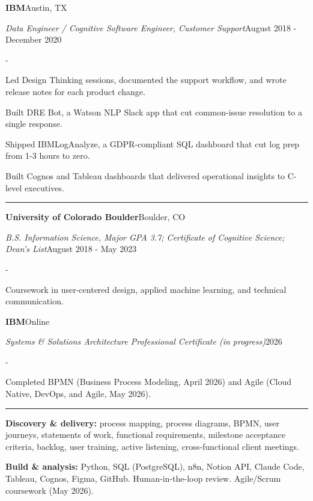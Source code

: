 \documentclass[10pt,letterpaper]{article}
\newenvironment{cvitems}{%
  \begin{list}{-}{%
    \setlength{\leftmargin}{12pt}%
    \setlength{\itemsep}{1.2pt}%
    \setlength{\parsep}{0pt}%
    \setlength{\topsep}{1.5pt}%
    \setlength{\partopsep}{0pt}%
    \setlength{\labelwidth}{6pt}%
    \setlength{\labelsep}{6pt}%
    \setlength{\itemindent}{0pt}%
  }%
}{\end{list}}
\newcommand{\cvsection}[1]{%
  \vspace{7pt}%
  \noindent{\bfseries\fontsize{11pt}{13pt}\selectfont\MakeUppercase{#1}}\par
  \vspace{1pt}%
  \noindent\rule{\textwidth}{0.4pt}\par
  \vspace{4pt}%
}
\newcommand{\cventryhead}[4]{%
  \noindent\textbf{#1}\hfill#2\par
  \vspace{0.5pt}%
  \noindent\textit{#3}\hfill#4\par
}
\newcommand{\cveduhead}[4]{%
  \noindent\textbf{#1}\hfill#2\par
  \vspace{0.5pt}%
  \noindent\textit{#3}\hfill#4\par
}
\begin{document}
\vspace{3pt}
\cventryhead{IBM}{Austin, TX}
{Data Engineer / Cognitive Software Engineer, Customer Support}{August 2018 - December 2020}
\begin{cvitems}
  \item Led Design Thinking sessions, documented the support workflow, and wrote release notes for each product change.
  \item Built DRE Bot, a Watson NLP Slack app that cut common-issue resolution to a single response.
  \item Shipped IBMLogAnalyze, a GDPR-compliant SQL dashboard that cut log prep from 1-3 hours to zero.
  \item Built Cognos and Tableau dashboards that delivered operational insights to C-level executives.
\end{cvitems}

\cvsection{Education}

\cveduhead{University of Colorado Boulder}{Boulder, CO}
{B.S. Information Science, Major GPA 3.7; Certificate of Cognitive Science; Dean's List}{August 2018 - May 2023}
\begin{cvitems}
  \item Coursework in user-centered design, applied machine learning, and technical communication.
\end{cvitems}

\vspace{3pt}
\cveduhead{IBM}{Online}
{Systems \& Solutions Architecture Professional Certificate (in progress)}{2026}
\begin{cvitems}
  \item Completed BPMN (Business Process Modeling, April 2026) and Agile (Cloud Native, DevOps, and Agile, May 2026).
\end{cvitems}

\cvsection{Skills}

{\raggedright
\noindent\textbf{Discovery \& delivery:} process mapping, process diagrams, BPMN, user journeys, statements of work, functional requirements, milestone acceptance criteria, backlog, user training, active listening, cross-functional client meetings.\par
\vspace{2pt}
\noindent\textbf{Build \& analysis:} Python, SQL (PostgreSQL), n8n, Notion API, Claude Code, Tableau, Cognos, Figma, GitHub. Human-in-the-loop review. Agile/Scrum coursework (May 2026).\par
}
\end{document}
